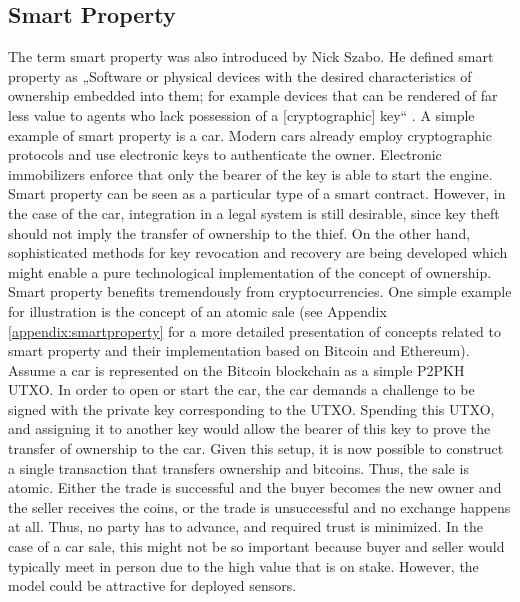 \subsection{Smart Property}
\label{sec:econdev:smartproperty}

The term smart property was also introduced by Nick Szabo. He defined smart property as „Software or physical devices with the desired characteristics of ownership embedded into them; for example devices that can be rendered of far less value to agents who lack possession of a [cryptographic] key“ \parencite{szabo1997}. A simple example of smart property is a car. Modern cars already employ cryptographic protocols and use electronic keys to authenticate the owner. Electronic immobilizers enforce that only the bearer of the key is able to start the engine. Smart property can be seen as a particular type of a smart contract. However, in the case of the car, integration in a legal system is still desirable, since key theft should not imply the transfer of ownership to the thief.  On the other hand, sophisticated methods for key revocation and recovery are being developed which might enable a pure technological implementation of the concept of ownership.
Smart property benefits tremendously from cryptocurrencies. One simple example for illustration is the concept of an atomic sale (see Appendix \ref{appendix:smartproperty} for a more detailed presentation of concepts related to smart property and their implementation based on Bitcoin and Ethereum). Assume a car is represented on the Bitcoin blockchain as a simple \ac{P2PKH} \ac{UTXO}. In order to open or start the car, the car demands a challenge to be signed with the private key corresponding to the \ac{UTXO}. Spending this \ac{UTXO}, and assigning it to another key would allow the bearer of this key to prove the transfer of ownership to the car. Given this setup, it is now possible to construct a single transaction that transfers ownership and bitcoins. Thus, the sale is atomic. Either the trade is successful and the buyer becomes the new owner and the seller receives the coins, or the trade is unsuccessful and no exchange happens at all. Thus, no party has to advance, and required trust is minimized. In the case of a car sale, this might not be so important because buyer and seller would typically meet in person due to the high value that is on stake. However, the model could be attractive for deployed sensors.

